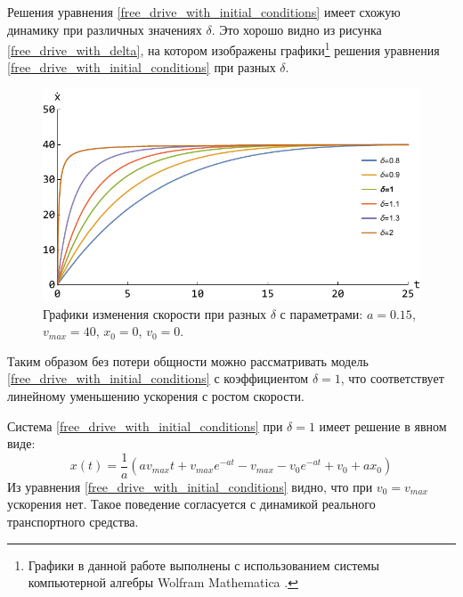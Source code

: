 \documentclass[12pt, a4paper]{extarticle}
\numberwithin{equation}{section}
\numberwithin{figure}{section}
\begin{document}
Решения уравнения \eqref{free_drive_with_initial_conditions} имеет схожую динамику при различных значениях $\delta$. Это хорошо видно из рисунка \eqref{free_drive_with_delta}, на котором изображены графики\footnote{Графики в данной работе выполнены с использованием системы компьютерной алгебры Wolfram Mathematica \cite{WolframMathematica}.} решения уравнения \eqref{free_drive_with_initial_conditions} при разных $\delta$.

\begin{figure}[h!]
	\begin{center}
		\begin{minipage}[h!]{0.48\linewidth}
			\includegraphics[width=1\linewidth,height=0.2\textheight]
			{Images/free_drive_speed_with_different_delta.pdf}
		\end{minipage}
		\caption{Графики изменения скорости при разных $\delta$ с параметрами: $a=0.15$, $v_{max}=40$, $x_0=0$, $v_0=0$.}
		\label{free_drive_with_delta}
	\end{center}
\end{figure}

Таким образом без потери общности можно рассматривать модель \eqref{free_drive_with_initial_conditions} с коэффициентом $\delta=1$, что соответствует линейному уменьшению ускорения с ростом скорости.

Система \eqref{free_drive_with_initial_conditions} при $\delta=1$ имеет решение в явном виде:
\begin{equation*}
x(t) =\dfrac{1}{a}\left(av_{max}t+v_{max}e^{-at}-v_{max}-v_0e^{-at}+v_0+ax_0\right) 
\end{equation*}
Из уравнения \eqref{free_drive_with_initial_conditions} видно, что при $v_0=v_{max}$ ускорения нет. Такое поведение согласуется с динамикой реального транспортного средства.
\end{document}
